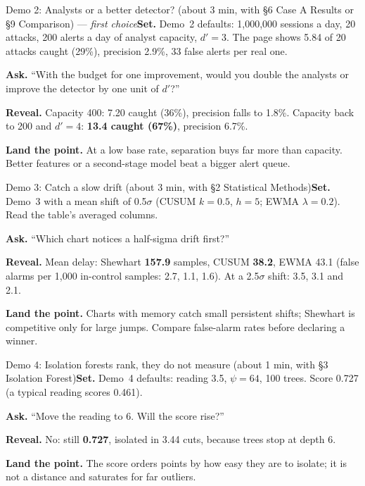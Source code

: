 \documentclass[11pt]{article}
\begin{document}
\begin{live}{Demo 2: Analysts or a better detector? (about 3 min, with \S6 Case A Results or \S9 Comparison) --- \emph{first choice}}\textbf{Set.} Demo~2 defaults: 1,000,000 sessions a day, 20 attacks, 200 alerts a day of analyst capacity, $d'=3$. The page shows 5.84 of 20 attacks caught (29\%), precision 2.9\%, 33 false alerts per real one.\par\smallskip\textbf{Ask.} ``With the budget for one improvement, would you double the analysts or improve the detector by one unit of $d'$?''\par\smallskip\textbf{Reveal.} Capacity 400: 7.20 caught (36\%), precision falls to 1.8\%. Capacity back to 200 and $d'=4$: \textbf{13.4 caught (67\%)}, precision 6.7\%.\par\smallskip\textbf{Land the point.} At a low base rate, separation buys far more than capacity. Better features or a second-stage model beat a bigger alert queue.\end{live}

\begin{live}{Demo 3: Catch a slow drift (about 3 min, with \S2 Statistical Methods)}\textbf{Set.} Demo~3 with a mean shift of 0.5$\sigma$ (CUSUM $k=0.5$, $h=5$; EWMA $\lambda=0.2$). Read the table's averaged columns.\par\smallskip\textbf{Ask.} ``Which chart notices a half-sigma drift first?''\par\smallskip\textbf{Reveal.} Mean delay: Shewhart \textbf{157.9} samples, CUSUM \textbf{38.2}, EWMA 43.1 (false alarms per 1,000 in-control samples: 2.7, 1.1, 1.6). At a 2.5$\sigma$ shift: 3.5, 3.1 and 2.1.\par\smallskip\textbf{Land the point.} Charts with memory catch small persistent shifts; Shewhart is competitive only for large jumps. Compare false-alarm rates before declaring a winner.\end{live}

\begin{live}{Demo 4: Isolation forests rank, they do not measure (about 1 min, with \S3 Isolation Forest)}\textbf{Set.} Demo~4 defaults: reading 3.5, $\psi=64$, 100 trees. Score 0.727 (a typical reading scores 0.461).\par\smallskip\textbf{Ask.} ``Move the reading to 6. Will the score rise?''\par\smallskip\textbf{Reveal.} No: still \textbf{0.727}, isolated in 3.44 cuts, because trees stop at depth 6.\par\smallskip\textbf{Land the point.} The score orders points by how easy they are to isolate; it is not a distance and saturates for far outliers.\end{live}
\end{document}
